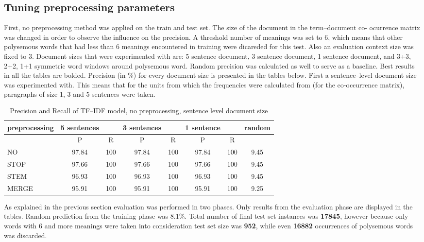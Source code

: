 \subsection{Tuning preprocessing parameters}
First, no preprocessing method was applied on the train and test set. The size of the document in the term--document co-
ocurrence matrix was changed in order to observe the influence on the precision. A threshold number of meanings was set to 6, which means that other polysemous words that had less than 6 meanings encountered in training were dicareded for this test. Also an evaluation context size was fixed to 3. Document sizes that were
experimented with are: 5 sentence document, 3 sentence document, 1 sentence document, and 3+3, 2+2, 1+1 symmetric word windows around polysemous word.  
Random precision was calculated as well to serve as a baseline. 
Best results in all the tables are bolded. 
Precision (in \%) for every document size is presented in the tables below. First a sentence--level 
document size was experimented with. This means that for the units from which the frequencies were calculated from (for the co-occurrence matrix), paragraphs of size 1, 3 and 5 sentences were taken. 
\begin{table}[h!]
\begin{tabular}{ l | c c | c c | c c | c}
   preprocessing &  5 sentences && 3 sentences && 1 sentence  && random\\
\hline
	& P  &  R & P  &  R & P  &  R &\\
\hline\hline
NO  & 97.84 & 100 & 97.84 & 100 & 97.84 & 100 & 9.45 \\
STOP  & 97.66 & 100 & 97.66 & 100 & 97.66 & 100 & 9.45 \\
STEM  & 96.93 & 100 & 96.93 & 100 & 96.93 & 100 & 9.45 \\
MERGE  & 95.91 & 100 & 95.91 & 100 & 95.91 & 100 & 9.25 \\
\end{tabular}
\caption{Precision and Recall of TF--IDF model, no preprocessing, sentence level document size}
\end{table}

As explained in the previous section evaluation was performed in two phases. Only results from the 
evaluation phase are displayed in the tables. Random prediction from the training phase was 8.1\%.
Total number of final test set instances was \textbf{17845}, however because only words with 6 and more 
meanings were taken into consideration test set size was \textbf{952}, while even \textbf{16882} occurrences of 
polysemous words was discarded.

